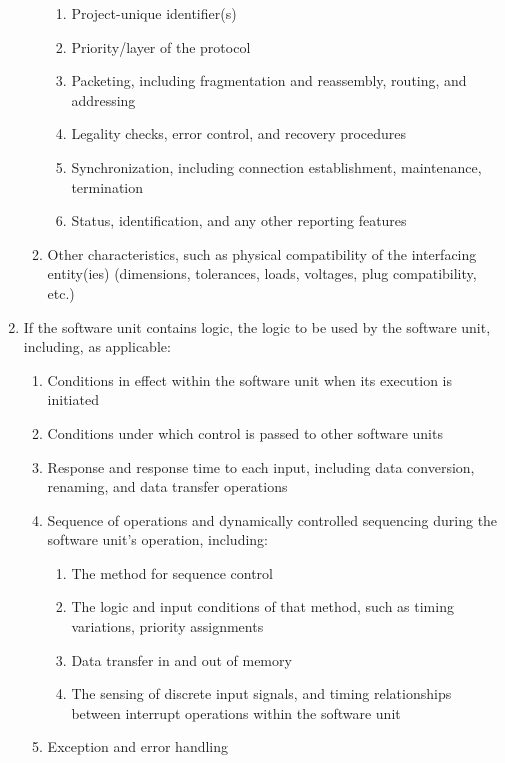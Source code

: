 \begin{enumerate}
\begin{enumerate}
    \begin{enumerate}
    \itemsep1pt\parskip0pt
    \item
      Project-unique identifier(s)
    \item
      Priority/layer of the protocol
    \item
      Packeting, including fragmentation and reassembly, routing, and
      addressing
    \item
      Legality checks, error control, and recovery procedures
    \item
      Synchronization, including connection establishment, maintenance,
      termination
    \item
      Status, identification, and any other reporting features
    \end{enumerate}
  \item
    Other characteristics, such as physical compatibility of the
    interfacing entity(ies) (dimensions, tolerances, loads, voltages,
    plug compatibility, etc.)
  \end{enumerate}
\item
  If the software unit contains logic, the logic to be used by the
  software unit, including, as applicable:

  \begin{enumerate}
  \itemsep1pt\parskip0pt
  \item
    Conditions in effect within the software unit when its execution is
    initiated
  \item
    Conditions under which control is passed to other software units
  \item
    Response and response time to each input, including data conversion,
    renaming, and data transfer operations
  \item
    Sequence of operations and dynamically controlled sequencing during
    the software unit's operation, including:

    \begin{enumerate}
    \itemsep1pt\parskip0pt
    \item
      The method for sequence control
    \item
      The logic and input conditions of that method, such as timing
      variations, priority assignments
    \item
      Data transfer in and out of memory
    \item
      The sensing of discrete input signals, and timing relationships
      between interrupt operations within the software unit
    \end{enumerate}
  \item
    Exception and error handling
  \end{enumerate}
\end{enumerate}


